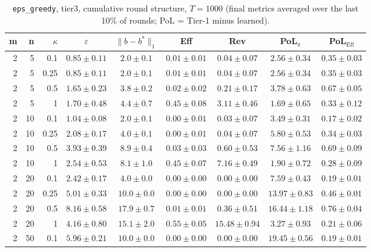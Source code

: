 \begin{table}[htbp]
\centering
\scriptsize
\caption{\texttt{eps\_greedy}, tier3, cumulative round structure, $T=1000$ (final metrics averaged over the last 10\% of rounds; PoL = Tier-1 minus learned).}
\label{tab:tier3_eps_greedy_cumulative}
\begin{tabular}{@{}rrrcccccc@{}}
\toprule
m & n & $\kappa$ & $\varepsilon$ & $\|b-b^*\|_1$ & Eff & Rev & PoL$_\pi$ & PoL$_\mathrm{Eff}$ \\
\midrule
2 & 5 & 0.1 & $0.85 \pm 0.11$ & $2.0 \pm 0.1$ & $0.01 \pm 0.01$ & $0.04 \pm 0.07$ & $2.56 \pm 0.34$ & $0.35 \pm 0.03$ \\
2 & 5 & 0.25 & $0.85 \pm 0.11$ & $2.0 \pm 0.1$ & $0.01 \pm 0.01$ & $0.04 \pm 0.07$ & $2.56 \pm 0.34$ & $0.35 \pm 0.03$ \\
2 & 5 & 0.5 & $1.65 \pm 0.23$ & $3.8 \pm 0.2$ & $0.02 \pm 0.02$ & $0.21 \pm 0.17$ & $3.78 \pm 0.63$ & $0.67 \pm 0.05$ \\
2 & 5 & 1 & $1.70 \pm 0.48$ & $4.4 \pm 0.7$ & $0.45 \pm 0.08$ & $3.11 \pm 0.46$ & $1.69 \pm 0.65$ & $0.33 \pm 0.12$ \\
2 & 10 & 0.1 & $1.04 \pm 0.08$ & $2.0 \pm 0.1$ & $0.00 \pm 0.01$ & $0.03 \pm 0.07$ & $3.49 \pm 0.31$ & $0.17 \pm 0.02$ \\
2 & 10 & 0.25 & $2.08 \pm 0.17$ & $4.0 \pm 0.1$ & $0.00 \pm 0.01$ & $0.04 \pm 0.07$ & $5.80 \pm 0.53$ & $0.34 \pm 0.03$ \\
2 & 10 & 0.5 & $3.93 \pm 0.39$ & $8.9 \pm 0.4$ & $0.03 \pm 0.03$ & $0.60 \pm 0.53$ & $7.56 \pm 1.16$ & $0.69 \pm 0.09$ \\
2 & 10 & 1 & $2.54 \pm 0.53$ & $8.1 \pm 1.0$ & $0.45 \pm 0.07$ & $7.16 \pm 0.49$ & $1.90 \pm 0.72$ & $0.28 \pm 0.09$ \\
2 & 20 & 0.1 & $2.42 \pm 0.17$ & $4.0 \pm 0.0$ & $0.00 \pm 0.00$ & $0.00 \pm 0.00$ & $7.59 \pm 0.43$ & $0.19 \pm 0.01$ \\
2 & 20 & 0.25 & $5.01 \pm 0.33$ & $10.0 \pm 0.0$ & $0.00 \pm 0.00$ & $0.00 \pm 0.00$ & $13.97 \pm 0.83$ & $0.46 \pm 0.01$ \\
2 & 20 & 0.5 & $8.16 \pm 0.58$ & $17.9 \pm 0.7$ & $0.01 \pm 0.01$ & $0.36 \pm 0.51$ & $16.44 \pm 1.18$ & $0.76 \pm 0.04$ \\
2 & 20 & 1 & $4.16 \pm 0.80$ & $15.1 \pm 2.0$ & $0.55 \pm 0.05$ & $15.48 \pm 0.94$ & $3.27 \pm 0.93$ & $0.21 \pm 0.06$ \\
2 & 50 & 0.1 & $5.96 \pm 0.21$ & $10.0 \pm 0.0$ & $0.00 \pm 0.00$ & $0.00 \pm 0.00$ & $19.45 \pm 0.56$ & $0.19 \pm 0.01$ \\

\end{tabular}
\end{table}
